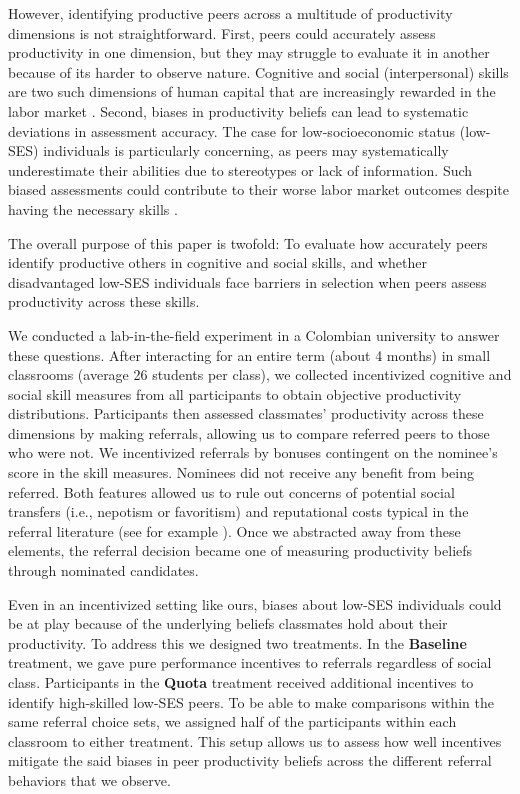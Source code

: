 \documentclass[11pt,a4paper,oneside]{article}
\begin{document}
However, identifying productive peers across a multitude of productivity dimensions is not straightforward. First, peers could accurately assess productivity in one dimension, but they may struggle to evaluate it in another because of its harder to observe nature. Cognitive and social (interpersonal) skills are two such dimensions of human capital that are increasingly rewarded in the labor market \citep{deming2017growing,deming2023multidimensional}. Second, biases in productivity beliefs can lead to systematic deviations in assessment accuracy. The case for low-socioeconomic status (low-SES) individuals is particularly concerning, as peers may systematically underestimate their abilities due to stereotypes or lack of information. Such biased assessments could contribute to their worse labor market outcomes despite having the necessary skills \citep{stansbury2024class}.
 
The overall purpose of this paper is twofold: To evaluate how accurately peers identify productive others in cognitive and social skills, and whether disadvantaged low-SES individuals face barriers in selection when peers assess productivity across these skills.

We conducted a lab-in-the-field experiment in a Colombian university to answer these questions. After interacting for an entire term (about 4 months) in small classrooms (average 26 students per class), we collected incentivized cognitive and social skill measures from all participants to obtain objective productivity distributions. Participants then assessed classmates' productivity across these dimensions by making referrals, allowing us to compare referred peers to those who were not. We incentivized referrals by bonuses contingent on the nominee's score in the skill measures. Nominees did not receive any benefit from being referred. Both features allowed us to rule out concerns of potential social transfers (i.e., nepotism or favoritism) and reputational costs typical in the referral literature (see for example \citet{bandiera2009social,witte2021workers}). Once we abstracted away from these elements, the referral decision became one of measuring productivity beliefs through nominated candidates. 

Even in an incentivized setting like ours, biases about low-SES individuals could be at play because of the underlying beliefs classmates hold about their productivity. To address this we designed two treatments. In the \textbf{Baseline} treatment, we gave pure performance incentives to referrals regardless of social class. Participants in the \textbf{Quota} treatment received additional incentives to identify high-skilled low-SES peers. To be able to make comparisons within the same referral choice sets, we assigned half of the participants within each classroom to either treatment. This setup allows us to assess how well incentives mitigate the said biases in peer productivity beliefs across the different referral behaviors that we observe.
\end{document}
